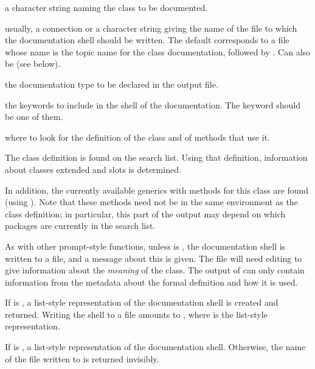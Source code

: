 \begin{Arguments}
\begin{ldescription}
\item[\code{clName}] a character string naming the class to be documented.
\item[\code{filename}] usually, a connection or a character string giving the
name of the file to which the documentation shell should be written.
The default corresponds to a file whose name is the topic name for
the class documentation, followed by .  Can also be
 (see below).
\item[\code{type}] the documentation type to be declared in the output file.
\item[\code{keywords}] the keywords to include in the shell of the
documentation.  The keyword  should be one of
them.
\item[\code{where}] where to look for the definition of the class and of
methods that use it.


\end{ldescription}
\end{Arguments}
%
\begin{Details}\relax
The class definition is found on the search list.  Using that
definition, information about classes extended and slots is
determined.

In addition, the currently available generics with methods for this
class are found (using ).  Note that these
methods need not be in the same environment as the class definition; in
particular, this part of the output may depend on which packages are
currently in the search list.

As with other prompt-style functions, unless  is
, the documentation shell is written to a file, and a message
about this is given.  The file will need editing to give information
about the \emph{meaning} of the class.  The output of
 can only contain information from the metadata
about the formal definition and how it is used.

If  is , a list-style representation of the
documentation shell is created and returned.  Writing the shell to a
file amounts to ,
where  is the list-style representation.
\end{Details}
%
\begin{Value}
If  is , a list-style representation of the
documentation shell.  Otherwise, the name of the file written to is
returned invisibly.
\end{Value}
